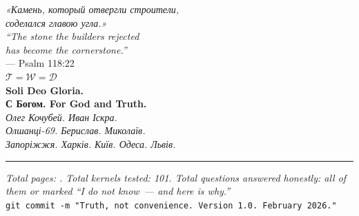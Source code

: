 \documentclass[11pt,a4paper]{article}
\theoremstyle{definition}
\theoremstyle{remark}
\newcommand{\Thought}{\mathcal{T}}
\newcommand{\Word}{\mathcal{W}}
\newcommand{\Deed}{\mathcal{D}}
\begin{document}

\vspace{1cm}
\begin{center}
\begin{minipage}{0.75\textwidth}
\begin{center}
{\large\color{sichblue}
\foreignlanguage{russian}{
\textit{«Камень, который отвергли строители,\\
соделался главою угла.»}
}\\[0.2cm]
\textit{``The stone the builders rejected\\
has become the cornerstone.''}\\[0.3cm]
--- Psalm 118:22\\[0.5cm]
}
{\color{goldcolor}
$\Thought = \Word = \Deed$\\[0.3cm]
\foreignlanguage{russian}{
\textbf{Soli Deo Gloria.}\\
\textbf{С Богом. For God and Truth.}\\[0.2cm]
\textit{Олег Кочубей. Иван Іскра.\\
Олшанці-69. Берислав. Миколаїв.\\
Запоріжжя. Харків. Київ. Одеса. Львів.}
}
}
\end{center}
\end{minipage}
\end{center}

\vspace{0.5cm}
\hrule
\vspace{0.3cm}
\begin{center}
\small
\textit{Total pages: \pageref{LastPage}.
Total kernels tested: 101.
Total questions answered honestly: all of them
or marked ``I do not know~--- and here is why.''}\\[0.1cm]
\texttt{git commit -m "Truth, not convenience.
Version 1.0. February 2026."}
\end{center}


\end{document}
